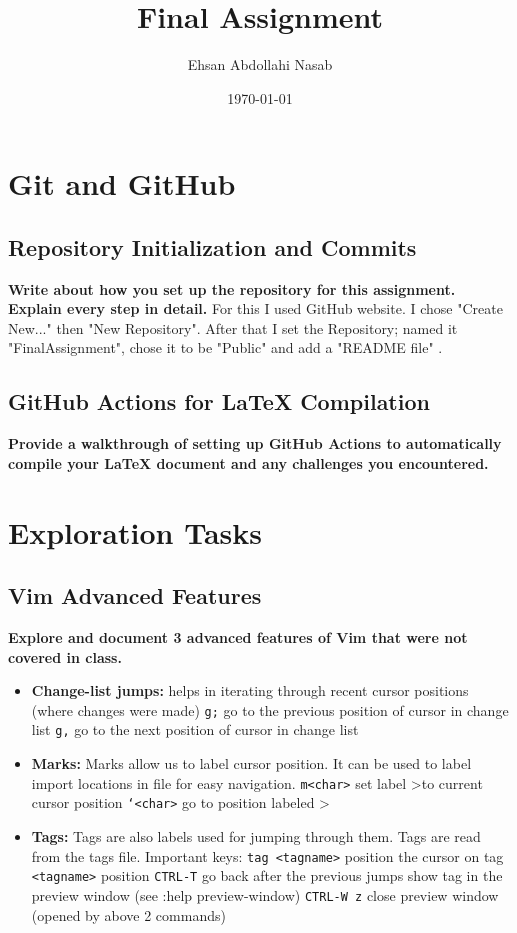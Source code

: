 \documentclass{article}
\title{Final Assignment}
\author{Ehsan Abdollahi Nasab}
\date{\today}
\begin{document}
    \maketitle

    \section{Git and GitHub}
    \subsection{Repository Initialization and Commits}
    \textbf{Write about how you set up the repository for this assignment. Explain every step in detail.}
    {\color{green}
    For this I used GitHub website. I chose "Create New..." then "New Repository". After that I set the Repository; named it "FinalAssignment", chose it to be "Public" and add a "README file"
    \color{black}.}
    \subsection{GitHub Actions for LaTeX Compilation}
    \textbf{Provide a walkthrough of setting up GitHub Actions to automatically compile your LaTeX document and any challenges you encountered.}
    {\color{green}
    \color{black}}

    \section{Exploration Tasks}
    \subsection{Vim Advanced Features}
    \textbf{Explore and document 3 advanced features of Vim that were not covered in class.}
    {\color{green}
    \begin{itemize}
        \item \textbf{Change-list jumps:} helps in iterating through recent cursor positions (where changes were made)
        \texttt{g;} go to the previous position of cursor in change list
        \texttt{g,} go to the next position of cursor in change list
        \item \textbf{Marks:} Marks allow us to label cursor position. It can be used to label import locations in file for easy navigation.
        \texttt{m<char>} set label \textlesschar\textgreater to current cursor position
        \texttt{`<char>} go to position labeled \textlesschar\textgreater
        \item \textbf{Tags:} Tags are also labels used for jumping through them. Tags are read from the tags file.
        Important keys:
        \texttt{tag <tagname>} position the cursor on tag \texttt{<tagname>} position
        \texttt{CTRL-T} go back after the previous jumps
         show tag in the preview window (see :help preview-window)
        \texttt{CTRL-W z} close preview window (opened by above 2 commands)
    \end{itemize}
    \color{black}
    }
\end{document}
